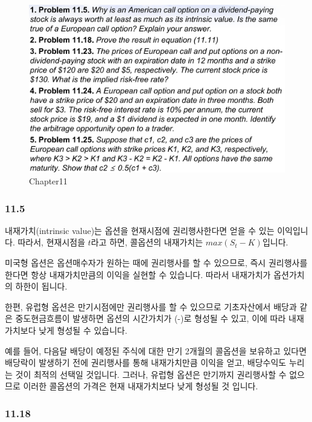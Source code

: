 \documentclass[
  letterpaper,
  DIV=11,
  numbers=noendperiod]{scrreprt}
\begin{document}
\begin{figure}[H]

{\centering \includegraphics{images/선물옵션_11.png}

}

\caption{Chapter11}

\end{figure}%

\subsubsection*{\texorpdfstring{\textbf{11.5}}{11.5}}\label{section-2}

내재가치(intrinsic value)는 옵션을 현재시점에 권리행사한다면 얻을 수
있는 이익입니다. 따라서, 현재시점을 \(t\)라고 하면, 콜옵션의 내재가치는
\(max(S_t-K)\)입니다.

미국형 옵션은 옵션매수자가 원하는 때에 권리행사를 할 수 있으므로, 즉시
권리행사를 한다면 항상 내재가치만큼의 이익을 실현할 수 있습니다. 따라서
내재가치가 옵션가치의 하한이 됩니다.

한편, 유럽형 옵션은 만기시점에만 권리행사를 할 수 있으므로 기초자산에서
배당과 같은 중도현금흐름이 발생하면 옵션의 시간가치가 (-)로 형성될 수
있고, 이에 따라 내재가치보다 낮게 형성될 수 있습니다.

예를 들어, 다음달 배당이 예정된 주식에 대한 만기 2개월의 콜옵션을
보유하고 있다면 배당락이 발생하기 전에 권리행사를 통해 내재가치만큼
이익을 얻고, 배당수익도 누리는 것이 최적의 선택일 것입니다. 그러나,
유럽형 옵션은 만기까지 권리행사할 수 없으므로 이러한 콜옵션의 가격은
현재 내재가치보다 낮게 형성될 것 입니다.

\subsubsection*{\texorpdfstring{\textbf{11.18}}{11.18}}\label{section-3}
\end{document}
